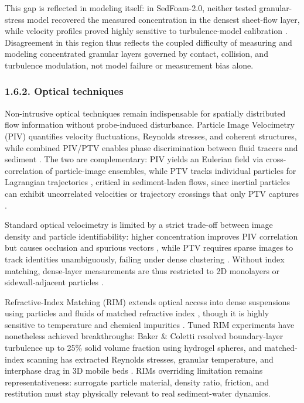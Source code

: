 This gap is reflected in modeling itself: in SedFoam-2.0, neither tested granular-stress model recovered the measured concentration in the densest sheet-flow layer, while velocity profiles proved highly sensitive to turbulence-model calibration \cite{chauchat__2017,maurin__2016}. Disagreement in this region thus reflects the coupled difficulty of measuring and modeling concentrated granular layers governed by contact, collision, and turbulence modulation, not model failure or measurement bias alone.

\subsubsection{1.6.2. Optical techniques}

Non-intrusive optical techniques remain indispensable for spatially distributed flow information without probe-induced disturbance. Particle Image Velocimetry (PIV) quantifies velocity fluctuations, Reynolds stresses, and coherent structures, while combined PIV/PTV enables phase discrimination between fluid tracers and sediment \cite{PEND_Adrian1991,PEND_Nezu2011,raffel__2018}. The two are complementary: PIV yields an Eulerian field via cross-correlation of particle-image ensembles, while PTV tracks individual particles for Lagrangian trajectories \cite{PEND_Khler2012}, critical in sediment-laden flows, since inertial particles can exhibit uncorrelated velocities or trajectory crossings that only PTV captures \cite{PEND_Ouellette2006}.

Standard optical velocimetry is limited by a strict trade-off between image density and particle identifiability: higher concentration improves PIV correlation but causes occlusion and spurious vectors \cite{PEND_Scharnowski2020}, while PTV requires sparse images to track identities unambiguously, failing under dense clustering \cite{PEND_Khler2012}. Without index matching, dense-layer measurements are thus restricted to 2D monolayers or sidewall-adjacent particles \cite{PEND_Frey2014,ni__2018}.

Refractive-Index Matching (RIM) extends optical access into dense suspensions using particles and fluids of matched refractive index \cite{PEND_Dijksman2012,PEND_Wiederseiner2011}, though it is highly sensitive to temperature and chemical impurities \cite{PEND_Wiederseiner2011}. Tuned RIM experiments have nonetheless achieved breakthroughs: Baker \& Coletti \cite{baker__2019} resolved boundary-layer turbulence up to 25\% solid volume fraction using hydrogel spheres, and matched-index scanning has extracted Reynolds stresses, granular temperature, and interphase drag in 3D mobile beds \cite{ni__2018}. RIM\textquotesingle s overriding limitation remains representativeness: surrogate particle material, density ratio, friction, and restitution must stay physically relevant to real sediment-water dynamics.

